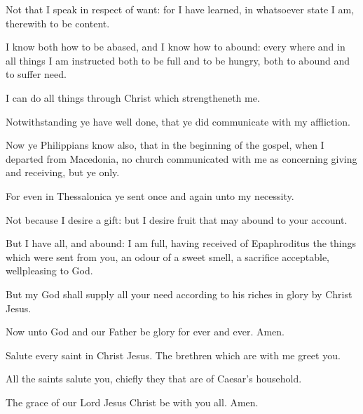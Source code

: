 \verse Not that I speak in respect of want: for I have learned, in whatsoever state I am, therewith to be content.

\verse I know both how to be abased, and I know how to abound: every where and in all things I am instructed both to be full and to be hungry, both to abound and to suffer need.

\verse I can do all things through Christ which strengtheneth me.

\verse Notwithstanding ye have well done, that ye did communicate with my affliction.

\verse Now ye Philippians know also, that in the beginning of the gospel, when I departed from Macedonia, no church communicated with me as concerning giving and receiving, but ye only.

\verse For even in Thessalonica ye sent once and again unto my necessity.

\verse Not because I desire a gift: but I desire fruit that may abound to your account.

\verse But I have all, and abound: I am full, having received of Epaphroditus the things which were sent from you, an odour of a sweet smell, a sacrifice acceptable, wellpleasing to God.

\verse But my God shall supply all your need according to his riches in glory by Christ Jesus.

\verse Now unto God and our Father be glory for ever and ever. Amen.

\verse Salute every saint in Christ Jesus. The brethren which are with me greet you.

\verse All the saints salute you, chiefly they that are of Caesar's household.

\verse The grace of our Lord Jesus Christ be with you all. Amen.


